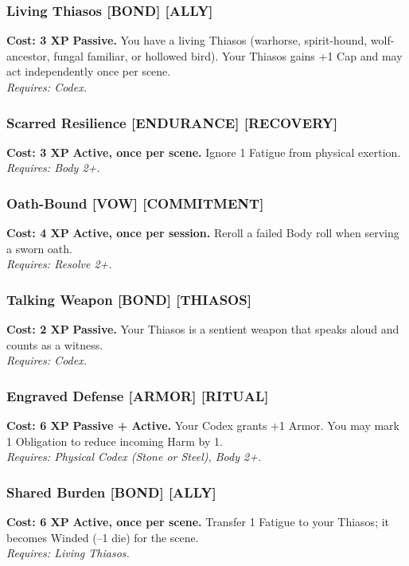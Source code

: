 \documentclass[12pt,a4paper]{book}
\begin{document}
\subsubsection*{Living Thiasos \textnormal{[BOND] [ALLY]}}
\label{talent:living-thiasos}
\textbf{Cost: 3 XP} \textbf{Passive.} You have a living Thiasos (warhorse, spirit-hound, wolf-ancestor, fungal familiar, or hollowed bird). Your Thiasos gains +1 Cap and may act independently once per scene. \\
\textit{Requires: Codex.}

\subsubsection*{Scarred Resilience \textnormal{[ENDURANCE] [RECOVERY]}}
\label{talent:scarred-resilience}
\textbf{Cost: 3 XP} \textbf{Active, once per scene.} Ignore 1 Fatigue from physical exertion. \\
\textit{Requires: Body 2+.}

\subsubsection*{Oath-Bound \textnormal{[VOW] [COMMITMENT]}}
\label{talent:oath-bound}
\textbf{Cost: 4 XP} \textbf{Active, once per session.} Reroll a failed Body roll when serving a sworn oath. \\
\textit{Requires: Resolve 2+.}

\subsubsection*{Talking Weapon \textnormal{[BOND] [THIASOS]}}
\label{talent:talking-weapon}
\textbf{Cost: 2 XP} \textbf{Passive.} Your Thiasos is a sentient weapon that speaks aloud and counts as a witness. \\
\textit{Requires: Codex.}

\subsubsection*{Engraved Defense \textnormal{[ARMOR] [RITUAL]}}
\label{talent:engraved-defense}
\textbf{Cost: 6 XP} \textbf{Passive + Active.} Your Codex grants +1 Armor. You may mark 1 Obligation to reduce incoming Harm by 1. \\
\textit{Requires: Physical Codex (Stone or Steel), Body 2+.}

\subsubsection*{Shared Burden \textnormal{[BOND] [ALLY]}}
\label{talent:shared-burden}
\textbf{Cost: 6 XP} \textbf{Active, once per scene.} Transfer 1 Fatigue to your Thiasos; it becomes Winded (--1 die) for the scene. \\
\textit{Requires: Living Thiasos.}
\end{document}
